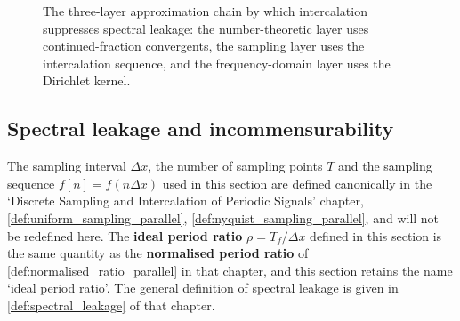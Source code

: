 \begin{figure}[htbp]
\centering
{}
\caption{The three-layer approximation chain by which intercalation suppresses spectral leakage: the number-theoretic layer uses continued-fraction convergents, the sampling layer uses the intercalation sequence, and the frequency-domain layer uses the Dirichlet kernel.}
\label{fig:three_layer_approximation}
\end{figure}

\subsection{Spectral leakage and incommensurability}

\begin{remark}\label{rem:harmonic_sampling_link}
The sampling interval $\Delta x$, the number of sampling points $T$ and the sampling sequence $f[n]=f(n\Delta x)$ used in this section are defined canonically in the `Discrete Sampling and Intercalation of Periodic Signals' chapter, \cref{def:uniform_sampling_parallel}, \cref{def:nyquist_sampling_parallel}, and will not be redefined here. The \textbf{ideal period ratio} $\rho=T_f/\Delta x$ defined in this section is the same quantity as the \textbf{normalised period ratio} of \cref{def:normalised_ratio_parallel} in that chapter, and this section retains the name `ideal period ratio'. The general definition of spectral leakage is given in \cref{def:spectral_leakage} of that chapter.
\end{remark}

